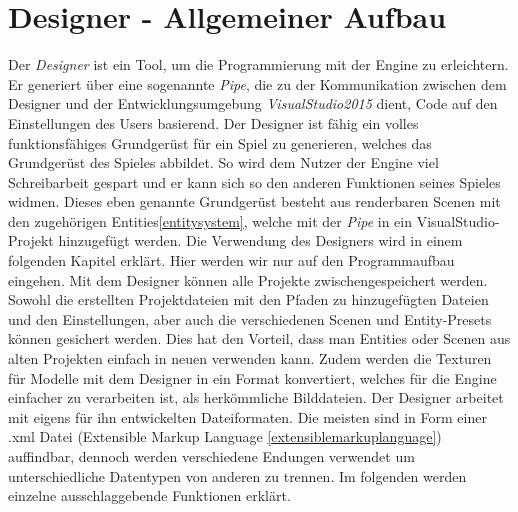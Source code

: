 \section{Designer - Allgemeiner Aufbau}
\label{designer}
Der \textit{Designer} ist ein Tool, um die Programmierung mit der Engine zu erleichtern. Er generiert über eine sogenannte \textit{Pipe}, die zu der Kommunikation zwischen dem Designer und der Entwicklungsumgebung \textit{VisualStudio2015} dient, Code auf den Einstellungen des Users basierend. Der Designer ist fähig ein volles funktionsfähiges Grundgerüst für ein Spiel zu generieren, welches das Grundgerüst des Spieles abbildet. So wird dem Nutzer der Engine viel Schreibarbeit gespart und er kann sich so den anderen Funktionen seines Spieles widmen.
Dieses eben genannte Grundgerüst besteht aus renderbaren Scenen mit den zugehörigen Entities\ref{entitysystem}, welche mit der \textit{Pipe} in ein VisualStudio-Projekt hinzugefügt werden.
Die Verwendung des Designers wird in einem folgenden Kapitel erklärt. Hier werden wir nur auf den Programmaufbau eingehen.
Mit dem Designer können alle Projekte zwischengespeichert werden. Sowohl die erstellten Projektdateien mit den Pfaden zu hinzugefügten Dateien und den Einstellungen, aber auch die verschiedenen Scenen und Entity-Presets können gesichert werden. Dies hat den Vorteil, dass man Entities oder Scenen aus alten Projekten einfach in neuen verwenden kann. Zudem werden die Texturen für Modelle mit dem Designer in ein Format konvertiert, welches für die Engine einfacher zu verarbeiten ist, als herkömmliche Bilddateien.
Der Designer arbeitet mit eigens für ihn entwickelten Dateiformaten. Die meisten sind in Form einer .xml Datei (Extensible Markup Language \cref{extensiblemarkuplanguage}) 
auffindbar, dennoch werden verschiedene Endungen verwendet um unterschiedliche Datentypen von anderen zu trennen. Im folgenden werden einzelne ausschlaggebende Funktionen erklärt.